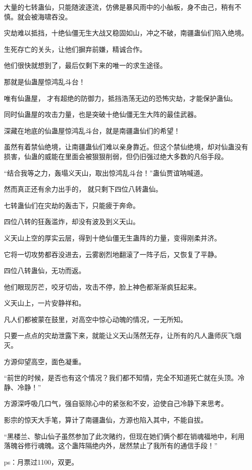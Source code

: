 \begin{this_body}
大量的七转蛊仙，只能随波逐流，仿佛是暴风雨中的小舢板，身不由己，稍有不慎。就会被海啸吞没。

灾劫难以抵挡，十绝仙僵无生大战又稳固如山，冲之不破，南疆蛊仙们陷入绝境。

生死存亡的关头，让他们摒弃前嫌，精诚合作。

他们很快就想到了，最后仅剩下来的唯一的求生途径。

那就是仙蛊屋惊鸿乱斗台！

唯有仙蛊屋， 才有超绝的防御力，抵挡浩荡无边的恐怖灾劫，才能保护蛊仙。

同时仙蛊屋的攻击力量，也是突破十绝仙僵无生大阵的最佳武器。

深藏在地底的仙蛊屋惊鸿乱斗台，就是南疆蛊仙们的希望！

虽然有着禁仙绝境，让南疆蛊仙们难以亲身靠近。但这个禁仙绝境，却对仙蛊没有损害，仙蛊的威能在里面会被狠狠削弱，但仍旧强过绝大多数的凡俗手段。

“结合我等之力，轰塌义天山，取出惊鸿乱斗台！”蛊仙贾谊呐喊道。

然而真正还有余力出手的， 就只剩下四位八转蛊仙。

七转蛊仙们在灾劫的轰击下，只能疲于奔命。

四位八转的狂轰滥炸，却没有波及到义天山。

义天山上空的厚实云层，得到十绝仙僵无生蛊阵的力量，变得刚柔并济。

它将一切攻势都吞没进去，云雾剧烈地翻滚了一阵子后，又恢复了平静。

四位八转蛊仙，无功而返。

他们眼现厉芒，咬牙切齿，攻击不停，脸上神色都渐渐疯狂起来。

义天山上，一片安静祥和。

凡人们都被蒙在鼓里，对高空中惊心动魄的情况，一无所知。

只要一点点的灾劫泄露下来，就能让义天山荡然无存，让所有的凡人蛊师灰飞烟灭。

方源仰望高空，面色凝重。

“前世的时候，是否也有这个情况？我们都不知情，完全不知道死亡就在头顶。冷静、冷静！”

方源深呼吸几口气，强自驱除心中的紧张和不安，迫使自己冷静下来思考。

影宗的惊天大手笔，算计了南疆蛊仙，方源也陷入其中，不能自拔。

“黑楼兰、黎山仙子虽然参加了此次赌约，但现在她们俩个都在销魂福地中，利用落魄谷修行魂魄。这个蛊阵隔绝内外，居然禁止了我所有的通信手段！”

ps：月票过1100，双更。

\end{this_body}

